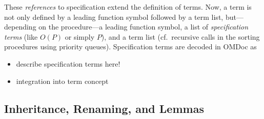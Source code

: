 \documentclass{article}
\theoremstyle{remark}
\theoremstyle{definition}
\begin{document}
These \emph{references} to specification extend the definition of terms. Now, a term is not only defined by a leading
function symbol followed by a term list, but---depending on the procedure---a leading function symbol, a list of
\emph{specification terms} (like $O(P)$ or simply $P$), and a term list (cf.\ recursive calls in the sorting procedures
using priority queues). Specification terms are decoded in OMDoc as

\begin{itemize}
 \item describe specification terms here!
 \item integration into term concept
\end{itemize}

\subsection{Inheritance, Renaming, and Lemmas}
\end{document}
